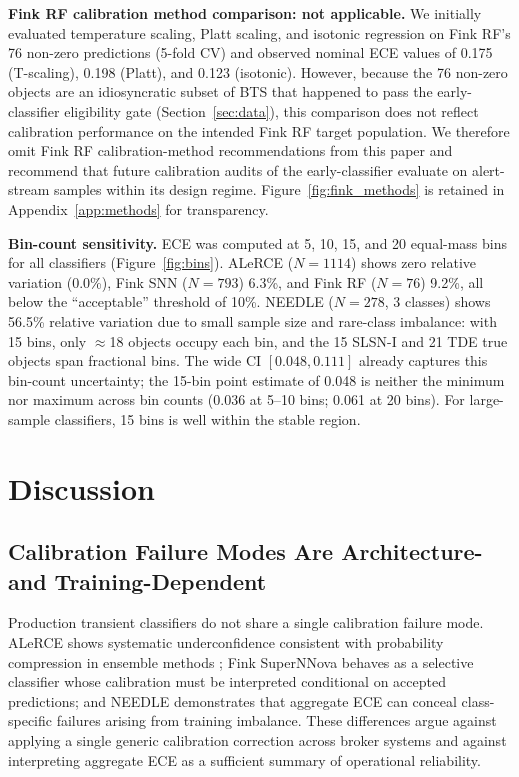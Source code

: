 \documentclass[twocolumn]{aastex631}
\begin{document}
\textbf{Fink RF calibration method comparison: not applicable.} We initially evaluated temperature scaling, Platt scaling, and isotonic regression on Fink RF's 76 non-zero predictions (5-fold CV) and observed nominal ECE values of 0.175 (T-scaling), 0.198 (Platt), and 0.123 (isotonic). However, because the 76 non-zero objects are an idiosyncratic subset of BTS that happened to pass the early-classifier eligibility gate (Section~\ref{sec:data}), this comparison does not reflect calibration performance on the intended Fink RF target population. We therefore omit Fink RF calibration-method recommendations from this paper and recommend that future calibration audits of the early-classifier evaluate on alert-stream samples within its design regime. Figure~\ref{fig:fink_methods} is retained in Appendix~\ref{app:methods} for transparency.

\textbf{Bin-count sensitivity.} ECE was computed at 5, 10, 15, and 20 equal-mass bins for all classifiers (Figure~\ref{fig:bins}). ALeRCE ($N = 1114$) shows zero relative variation (0.0\%), Fink SNN ($N = 793$) 6.3\%, and Fink RF ($N = 76$) 9.2\%, all below the ``acceptable'' threshold of 10\%. NEEDLE ($N = 278$, 3 classes) shows 56.5\% relative variation due to small sample size and rare-class imbalance: with 15 bins, only $\approx$18 objects occupy each bin, and the 15 SLSN-I and 21 TDE true objects span fractional bins. The wide CI $[0.048, 0.111]$ already captures this bin-count uncertainty; the 15-bin point estimate of 0.048 is neither the minimum nor maximum across bin counts (0.036 at 5--10 bins; 0.061 at 20 bins). For large-sample classifiers, 15 bins is well within the stable region.


\section{Discussion}\label{sec:discussion}

\subsection{Calibration Failure Modes Are Architecture- and
Training-Dependent}\label{sec:disc_architecture}

Production transient classifiers do not share a single calibration
failure mode. ALeRCE shows systematic underconfidence consistent
with probability compression in ensemble methods
\citep{niculescumizil2005, bostrom2008}; Fink SuperNNova behaves
as a selective classifier whose calibration must be interpreted
conditional on accepted predictions; and NEEDLE demonstrates that
aggregate ECE can conceal class-specific failures arising from
training imbalance. These differences argue against applying a
single generic calibration correction across broker systems and
against interpreting aggregate ECE as a sufficient summary of
operational reliability.
\end{document}
